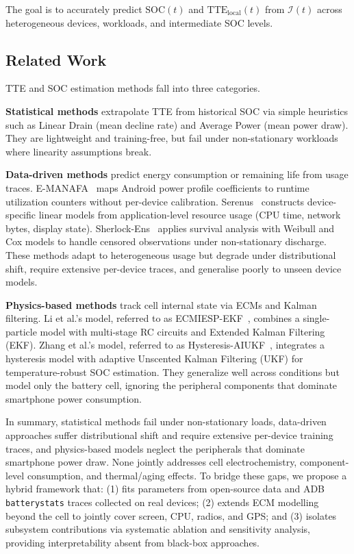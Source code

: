 \documentclass[conference]{IEEEtran}
\begin{document}
The goal is to accurately predict $\mathrm{SOC}(t)$ and $\mathrm{TTE}_{\mathrm{local}}(t)$ from $\mathcal{I}(t)$ across heterogeneous devices, workloads, and intermediate SOC levels.

\subsection{Related Work}
\label{subsec:related_work}

TTE and SOC estimation methods fall into three categories.

\textbf{Statistical methods} extrapolate TTE from historical SOC via simple heuristics such as Linear Drain (mean decline rate) and Average Power (mean power draw). They are lightweight and training-free, but fail under non-stationary workloads where linearity assumptions break.

\textbf{Data-driven methods} predict energy consumption or remaining life from usage traces. E-MANAFA~\cite{10.1145/3551349.3561342} maps Android power profile coefficients to runtime utilization counters without per-device calibration. Serenus~\cite{10.1145/3654777.3676437} constructs device-specific linear models from application-level resource usage (CPU time, network bytes, display state). Sherlock-Ens~\cite{li2018predictingsmartphonebatterylife} applies survival analysis with Weibull and Cox models to handle censored observations under non-stationary discharge. These methods adapt to heterogeneous usage but degrade under distributional shift, require extensive per-device traces, and generalise poorly to unseen device models.

\textbf{Physics-based methods} track cell internal state via ECMs and Kalman filtering. Li et al.'s model, referred to as ECMIESP-EKF~\cite{en17153782}, combines a single-particle model with multi-stage RC circuits and Extended Kalman Filtering (EKF). Zhang et al.'s model, referred to as Hysteresis-AIUKF~\cite{ZHANG2024114105}, integrates a hysteresis model with adaptive Unscented Kalman Filtering (UKF) for temperature-robust SOC estimation. They generalize well across conditions but model only the battery cell, ignoring the peripheral components that dominate smartphone power consumption.

In summary, statistical methods fail under non-stationary loads, data-driven approaches suffer distributional shift and require extensive per-device training traces, and physics-based models neglect the peripherals that dominate smartphone power draw. None jointly addresses cell electrochemistry, component-level consumption, and thermal/aging effects. To bridge these gaps, we propose a hybrid framework that: (1) fits parameters from open-source data and ADB \texttt{batterystats} traces collected on real devices; (2) extends ECM modelling beyond the cell to jointly cover screen, CPU, radios, and GPS; and (3) isolates subsystem contributions via systematic ablation and sensitivity analysis, providing interpretability absent from black-box approaches.
\end{document}
